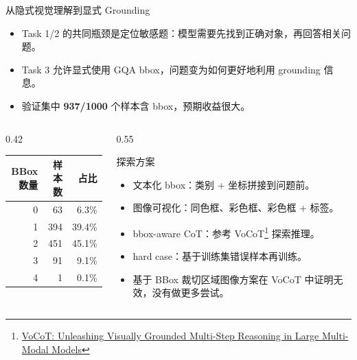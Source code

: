 \documentclass{beamer}
\begin{document}
\begin{frame}[shrink=4]{从隐式视觉理解到显式 Grounding}
\small
\begin{itemize}
\item Task 1/2 的共同瓶颈是定位敏感题：模型需要先找到正确对象，再回答相关问题。
\item Task 3 允许显式使用 GQA bbox，问题变为如何更好地利用 grounding 信息。
\item 验证集中 \textbf{937/1000} 个样本含 bbox，预期收益很大。
\end{itemize}
\begin{columns}[T,onlytextwidth]
\begin{column}{0.42\textwidth}
\centering
\begin{tabular}{rrr}
\toprule
BBox 数量 & 样本数 & 占比 \\
\midrule
0 & 63 & 6.3\% \\
1 & 394 & 39.4\% \\
2 & 451 & 45.1\% \\
3 & 91 & 9.1\% \\
4 & 1 & 0.1\% \\
\bottomrule
\end{tabular}
\end{column}
\begin{column}{0.55\textwidth}
\vspace{-1em}
\begin{block}{探索方案}
\begin{itemize}
\item 文本化 bbox：类别 + 坐标拼接到问题前。
\item 图像可视化：同色框、彩色框、彩色框 + 标签。
\item bbox-aware CoT：参考 VoCoT\footnote{\href{https://arxiv.org/abs/2405.16919}{VoCoT: Unleashing Visually Grounded Multi-Step Reasoning in Large Multi-Modal Models}} 探索推理。
\item hard case：基于训练集错误样本再训练。
\item 基于 BBox 裁切区域图像方案在 VoCoT 中证明无效，没有做更多尝试。
\end{itemize}
\end{block}
\end{column}
\end{columns}
\end{frame}
\end{document}
